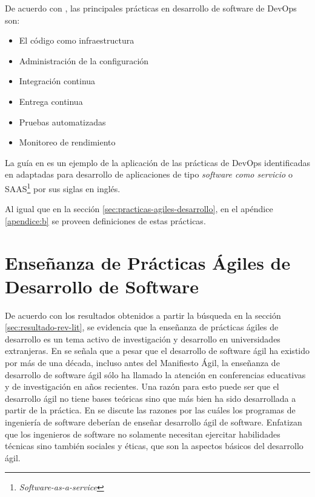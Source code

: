 \documentclass[journal]{IEEEtran}
\begin{document}
De acuerdo con \cite{jabbari-et-al}, las principales prácticas en desarrollo de software de DevOps son:
\begin{itemize}
    \item El código como infraestructura
    \item Administración de la configuración
    \item Integración continua
    \item Entrega continua
    \item Pruebas automatizadas
    \item Monitoreo de rendimiento
\end{itemize}
La guía en \cite{wiggins} es un ejemplo de la aplicación de las prácticas de DevOps identificadas en \cite{jabbari-et-al} adaptadas para desarrollo de aplicaciones de tipo \emph{software como servicio} o SAAS\footnote{\emph{Software-as-a-service}} por sus siglas en inglés.

Al igual que en la sección \ref{sec:practicas-agiles-desarrollo}, en el apéndice \ref{apendice:b} se proveen definiciones de estas prácticas.

\section{Enseñanza de Prácticas Ágiles de Desarrollo de Software} \label{sec:ensenanza}
De acuerdo con los resultados obtenidos a partir la búsqueda en la sección \ref{sec:resultado-rev-lit}, se evidencia que la enseñanza de prácticas ágiles de desarrollo es un tema activo de investigación y desarrollo en universidades extranjeras. En \cite{kropp-meier-1} se señala que a pesar que el desarrollo de software ágil ha existido por más de una década, incluso antes del Manifiesto Ágil, la enseñanza de desarrollo de software ágil sólo ha llamado la atención en conferencias educativas y de investigación en años recientes. Una razón para esto puede ser que el desarrollo ágil no tiene bases teóricas sino que más bien ha sido desarrollada a partir de la práctica. En \cite{hazzan-dubinsky} se discute las razones por las cuáles los programas de ingeniería de software deberían de enseñar desarrollo ágil de software. Enfatizan que los ingenieros de software no solamente necesitan ejercitar habilidades técnicas sino también sociales y éticas, que son la aspectos básicos del desarrollo ágil.
\end{document}
